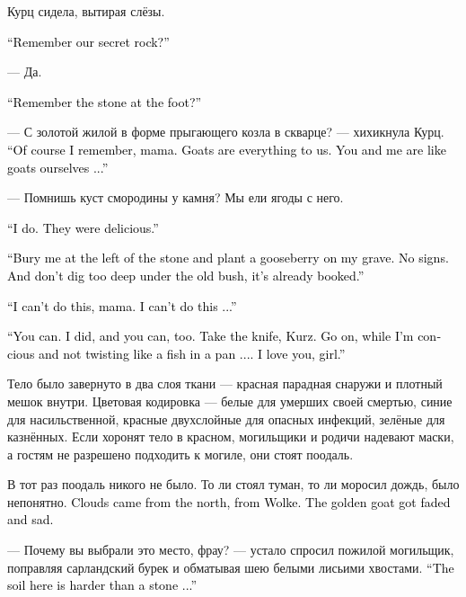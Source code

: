 \documentclass[a4paper,12pt,fleqn]{book}\usepackage{cooltooltips}\usepackage{polyglossia}\setdefaultlanguage[babelshorthands=true]{russian}\setotherlanguage{english}\defaultfontfeatures{Ligatures=TeX,Mapping=tex-text} \usepackage{xcolor}\definecolor{lightgray}{HTML}{bbbbbb}\color{lightgray}\newcommand{\ml}[3]{\textenglish{\textcolor{black}{#3}}}
\begin{document}
Курц сидела, вытирая слёзы.

\ml{$0$}
{--- Помнишь нашу тайную скалу?}
{``Remember our secret rock?''}

--- Да.

\ml{$0$}
{--- Помнишь камень у подножия?}
{``Remember the stone at the foot?''}

--- С золотой жилой в форме прыгающего козла в скварце? --- хихикнула Курц.
\ml{$0$}
{--- Конечно, помню, мама.}
{``Of course I remember, mama.}
\ml{$0$}
{Козы --- это наше всё.}
{Goats are everything to us.}
\ml{$0$}
{Мы сами как козы с тобой...}
{You and me are like goats ourselves ...''}

--- Помнишь куст смородины у камня?
Мы ели ягоды с него.

\ml{$0$}
{--- Да.}
{``I do.}
\ml{$0$}
{Было вкусно.}
{They were delicious.''}

\ml{$0$}
{--- Похорони меня слева от камня и посади смородину на моей могиле.}
{``Bury me at the left of the stone and plant a gooseberry on my grave.}
\ml{$0$}
{Надписей не нужно.}
{No signs.}
\ml{$0$}
{Под старым кустом больно не копай, там уже занято.}
{And don't dig too deep under the old bush, it's already booked.''}

\ml{$0$}
{--- Я не смогу, мама.}
{``I can't do this, mama.}
\ml{$0$}
{Я не смогу...}
{I can't do this ...''}

\ml{$0$}
{--- Сможешь.}
{``You can.}
\ml{$0$}
{Я смогла и ты сможешь.}
{I did, and you can, too.}
\ml{$0$}
{Бери нож, Курц.}
{Take the knife, Kurz.}
\ml{$0$}
{Давай, пока я в сознании и не верчусь как рыбина на сковородке...}
{Go on, while I'm concious and not twisting like a fish in a pan ....}
\ml{$0$}
{Я люблю тебя, девочка.}
{I love you, girl.''}

Тело было завернуто в два слоя ткани --- красная парадная снаружи и плотный мешок внутри.
Цветовая кодировка --- белые для умерших своей смертью, синие для насильственной, красные двухслойные для опасных инфекций, зелёные для казнённых.
Если хоронят тело в красном, могильщики и родичи надевают маски, а гостям не разрешено подходить к могиле, они стоят поодаль.

В тот раз поодаль никого не было.
То ли стоял туман, то ли моросил дождь, было непонятно.
\ml{$0$}
{Облака пришли с севера, с Вольке.}
{Clouds came from the north, from Wolke.}
\ml{$0$}
{Золотой козёл потускнел и погрустнел.}
{The golden goat got faded and sad.}

--- Почему вы выбрали это место, фрау? --- устало спросил пожилой могильщик, поправляя сарландский бурек и обматывая шею белыми лисьими хвостами.
\ml{$0$}
{--- Здесь земля твёрже камня...}
{``The soil here is harder than a stone ...''}
\end{document}
